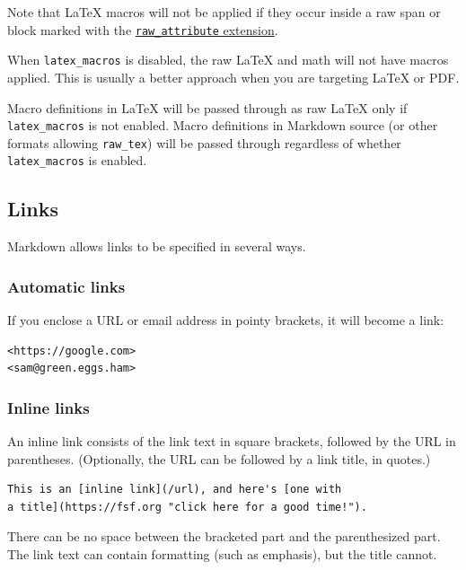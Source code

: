 \documentclass[
]{article}
\begin{document}
Note that LaTeX macros will not be applied if they occur inside a raw
span or block marked with the
\protect\hyperlink{extension-raw_attribute}{\texttt{raw\_attribute}
extension}.

When \texttt{latex\_macros} is disabled, the raw LaTeX and math will not
have macros applied. This is usually a better approach when you are
targeting LaTeX or PDF.

Macro definitions in LaTeX will be passed through as raw LaTeX only if
\texttt{latex\_macros} is not enabled. Macro definitions in Markdown
source (or other formats allowing \texttt{raw\_tex}) will be passed
through regardless of whether \texttt{latex\_macros} is enabled.

\hypertarget{links-1}{%
\subsection{Links}\label{links-1}}

Markdown allows links to be specified in several ways.

\hypertarget{automatic-links}{%
\subsubsection{Automatic links}\label{automatic-links}}

If you enclose a URL or email address in pointy brackets, it will become
a link:

\begin{verbatim}
<https://google.com>
<sam@green.eggs.ham>
\end{verbatim}

\hypertarget{inline-links}{%
\subsubsection{Inline links}\label{inline-links}}

An inline link consists of the link text in square brackets, followed by
the URL in parentheses. (Optionally, the URL can be followed by a link
title, in quotes.)

\begin{verbatim}
This is an [inline link](/url), and here's [one with
a title](https://fsf.org "click here for a good time!").
\end{verbatim}

There can be no space between the bracketed part and the parenthesized
part. The link text can contain formatting (such as emphasis), but the
title cannot.
\end{document}
